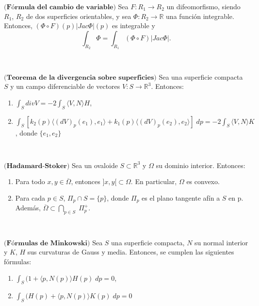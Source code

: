 \begin{teorema}
	$\textbf{(Fórmula del cambio de variable)}$ Sea $F : R_1 \to R_2$ un difeomorfismo, siendo $R_1$, $R_2$ de dos superficies orientables, y sea $\Phi : R_2 \to \mathbb{R}$ una función integrable. Entonces, $(\Phi \circ F)(p)|Jac \Phi|(p)$ es integrable y
	\[
	\int_{R_2} \Phi = \int_{R_1} (\Phi \circ F)|Jac \Phi|.
	\]
\end{teorema}
${ }$\\

\begin{teorema}\label{teo:divergencia}
	$\textbf{(Teorema de la divergencia sobre superficies)}$ Sea una superficie compacta $S$ y un campo diferenciable de vectores $V : S \to \mathbb{R}^3$. Entonces:
	\begin{enumerate}
		\item $\int_S div V = -2 \int_S \langle V, N \rangle H$,
		\item $\int_S [k_2(p) \langle (dV)_p(e_1), e_1\rangle + k_1(p) \langle (dV)_p(e_2), e_2 \rangle ] \; dp = -2 \int_S \langle V, N \rangle K$, donde $\{ e_1, e_2 \}$
	\end{enumerate}
\end{teorema}
${ }$\\

\begin{teorema} \label{teo:hadamard}
	$\textbf{(Hadamard-Stoker)}$ Sea un ovaloide $S \subset \mathbb{R}^3$ y $\Omega$ su dominio interior. Entonces:
	
	\begin{enumerate}
		\item Para todo $x, y \in \overline{\Omega}$, entonces $]x, y[ \subset \Omega$. En particular, $\Omega$ es convexo.
		\item Para cada $p \in S$, $\Pi_p \cap S = \{p\}$, donde $\Pi_p$ es el plano tangente afín a $S$ en p. Además, $\overline{\Omega} \subset \bigcap_{p \in S} \; \Pi^{+}_{p}$.
	\end{enumerate}
\end{teorema}
${ }$\\

\begin{teorema}
	$\textbf{(Fórmulas de Minkowski)}$ Sea $S$ una superficie compacta, $N$ su normal interior y $K$, $H$ sus curvaturas de Gauss y media. Entonces, se cumplen las siguientes fórmulas:
	\begin{enumerate}
		\item $\int_S (1 + \langle p, N(p) \rangle H(p) \; dp = 0$,
		\item $\int_S (H(p) + \langle p, N(p) \rangle K(p) \; dp = 0$
	\end{enumerate}
\end{teorema}
${ }$\\

